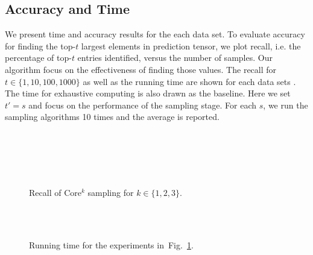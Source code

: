 \documentclass[10pt,journal,compsoc]{IEEEtran}
\newcommand{\Fig}[1]{Fig.~\ref{fig:#1}}
\begin{document}
\subsection{Accuracy and Time}

We present time and accuracy results for the each data set. To evaluate accuracy for finding the top-$t$ largest elements in prediction tensor, we plot recall, i.e. the percentage of top-$t$ entries identified, versus the number of samples. Our algorithm focus on the effectiveness of finding those values. The recall for $t\in\{1,10,100,1000\}$ as well as the running time are shown for each data sets . The time for exhaustive computing is also drawn as the baseline. Here we set $t'=s$ and focus on the performance of the sampling stage. For each $s$, we run the sampling algorithms 10 times and the average is reported.

\begin{figure}[!tbh]
	\centering
	\\
	\\
	\\
	\\
	\caption{Recall of Core$^k$ sampling for $k\in\{1,2,3\}$.}
	\label{fig:BasicRecall}
\end{figure}

\begin{figure}[!tbh]
	\centering
	\\
	\\
	\caption{Running time for the experiments in~\Fig{BasicRecall}.}
	\label{fig:BasicTime}
\end{figure}
\end{document}
